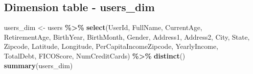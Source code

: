 \documentclass[
]{article}
\newenvironment{Shaded}{\begin{snugshade}}{\end{snugshade}}
\newcommand{\FunctionTok}[1]{\textcolor[rgb]{0.13,0.29,0.53}{\textbf{#1}}}
\newcommand{\NormalTok}[1]{#1}
\newcommand{\OtherTok}[1]{\textcolor[rgb]{0.56,0.35,0.01}{#1}}
\newcommand{\SpecialCharTok}[1]{\textcolor[rgb]{0.81,0.36,0.00}{\textbf{#1}}}
\begin{document}
\subsection{Dimension table -
users\_dim}\label{dimension-table---users_dim}

\begin{Shaded}
\begin{Highlighting}[]
\NormalTok{users\_dim }\OtherTok{\textless{}{-}}\NormalTok{ users }\SpecialCharTok{\%\textgreater{}\%} \FunctionTok{select}\NormalTok{(UserId, FullName, CurrentAge, RetirementAge, }
\NormalTok{                              BirthYear, BirthMonth, Gender, Address1, Address2, }
\NormalTok{                              City, State, Zipcode, Latitude, Longitude, }
\NormalTok{                              PerCapitaIncomeZipcode, YearlyIncome, TotalDebt, }
\NormalTok{                              FICOScore, NumCreditCards) }\SpecialCharTok{\%\textgreater{}\%} \FunctionTok{distinct}\NormalTok{()}
\FunctionTok{summary}\NormalTok{(users\_dim)}
\end{Highlighting}
\end{Shaded}
\end{document}
